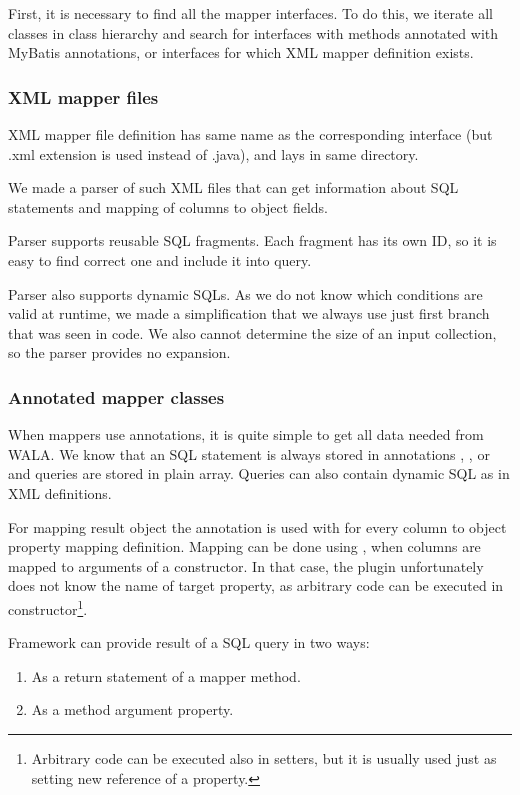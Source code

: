 First, it is necessary to find all the mapper interfaces.
To do this, we iterate all classes in class hierarchy and search 
for interfaces with methods annotated with MyBatis annotations,
or interfaces for which XML mapper definition exists.



\subsubsection{XML mapper files}

XML mapper file definition has same name as the corresponding interface
(but .xml extension is used instead of .java), and lays in same directory.

We made a parser of such XML files that can get information about SQL statements
and mapping of columns to object fields.

Parser supports reusable SQL fragments. Each fragment has its own ID,
so it is easy to find correct one and include it into query.

Parser also supports dynamic SQLs. As we do not know which conditions are valid
at runtime, we made a simplification that we always use just first branch that
was seen in code.
We also cannot determine the size of an input collection, so the parser provides no expansion.



\subsubsection{Annotated mapper classes}

When mappers use annotations, it is quite simple to get all data needed
from WALA. We know that an SQL statement is always stored in annotations
, ,  or 
and queries are stored in plain  array.
Queries can also contain dynamic SQL as in XML definitions.

For mapping result object the  annotation is used with 
for every column to object property mapping definition.
Mapping can be done using , when columns are mapped
to arguments of a constructor. In that case, the plugin unfortunately does not know
the name of target property, as arbitrary code can be executed in constructor\footnote{
  Arbitrary code can be executed also in setters, but it is usually used
  just as setting new reference of a property.
}.

Framework can provide result of a SQL query in two ways:
\begin{enumerate}
  \item As a return statement of a mapper method.
  \item As a method argument property.
\end{enumerate}


